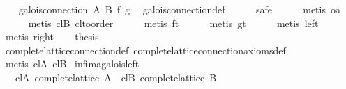 \begin{isabellebody}
\isanewline
\isanewline
\ \ \isamarkupfalse%
\ {}galois{}connection\ A\ B\ f\ g{}\ \isamarkupfalse%
\ galois{}connection{}def\isanewline
\ \ \ \ \isamarkupfalse%
\ safe\isanewline
\ \ \ \ \isamarkupfalse%
\ {}metis\ oa{}\isanewline
\ \ \ \ \isamarkupfalse%
\ {}metis\ cl{}B\ cl{}to{}order{}\isanewline
\ \ \ \ \isamarkupfalse%
\ {}metis\ ft{}\isanewline
\ \ \ \ \isamarkupfalse%
\ {}metis\ gt{}\isanewline
\ \ \ \ \isamarkupfalse%
\ {}metis\ left{}\isanewline
\ \ \ \ \isamarkupfalse%
\ {}metis\ right{}\isanewline
\ \ \isamarkupfalse%
\ {}thesis\ \isamarkupfalse%
\ complete{}lattice{}connection{}def\ complete{}lattice{}connection{}axioms{}def\isanewline
\ \ \ \ \isamarkupfalse%
\ {}metis\ cl{}A\ cl{}B{}\isanewline
{}\isamarkupfalse%
%
\endisatagproof
{\isafoldproof}%
%
\isadelimproof
\isanewline
%
\endisadelimproof
\isanewline
\isanewline
\isanewline
{}\isamarkupfalse%
\ infima{}galois{}left{}\isanewline
\ \ \ cl{}A{}\ {}complete{}lattice\ A{}\ \ cl{}B{}\ {}complete{}lattice\ B{}\isanewline

\end{isabellebody}
